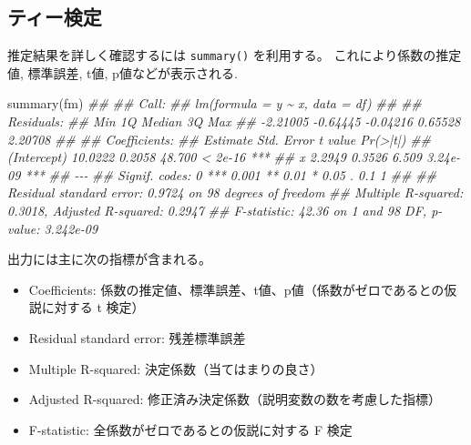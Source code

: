 \documentclass[
  letterpaper,
  xelatex,
  ja=standard, xelatex]{bxjsbook}
\newenvironment{Shaded}{\begin{snugshade}}{\end{snugshade}}
\newcommand{\DocumentationTok}[1]{\textcolor[rgb]{0.37,0.37,0.37}{\textit{#1}}}
\newcommand{\FunctionTok}[1]{\textcolor[rgb]{0.28,0.35,0.67}{#1}}
\newcommand{\NormalTok}[1]{\textcolor[rgb]{0.00,0.23,0.31}{#1}}
\providecommand{\tightlist}{%
  \setlength{\itemsep}{0pt}\setlength{\parskip}{0pt}}\usepackage{longtable,booktabs,array}
\begin{document}
\subsection{ティー検定}\label{ux30c6ux30a3ux30fcux691cux5b9a}

推定結果を詳しく確認するには \texttt{summary()} を利用する。
これにより係数の推定値, 標準誤差, t値, p値などが表示される.

\begin{Shaded}
\begin{Highlighting}[]
\FunctionTok{summary}\NormalTok{(fm)}
\DocumentationTok{\#\# }
\DocumentationTok{\#\# Call:}
\DocumentationTok{\#\# lm(formula = y \textasciitilde{} x, data = df)}
\DocumentationTok{\#\# }
\DocumentationTok{\#\# Residuals:}
\DocumentationTok{\#\#      Min       1Q   Median       3Q      Max }
\DocumentationTok{\#\# {-}2.21005 {-}0.64445 {-}0.04216  0.65528  2.20708 }
\DocumentationTok{\#\# }
\DocumentationTok{\#\# Coefficients:}
\DocumentationTok{\#\#             Estimate Std. Error t value Pr(\textgreater{}|t|)    }
\DocumentationTok{\#\# (Intercept)  10.0222     0.2058  48.700  \textless{} 2e{-}16 ***}
\DocumentationTok{\#\# x             2.2949     0.3526   6.509 3.24e{-}09 ***}
\DocumentationTok{\#\# {-}{-}{-}}
\DocumentationTok{\#\# Signif. codes:  0 \textquotesingle{}***\textquotesingle{} 0.001 \textquotesingle{}**\textquotesingle{} 0.01 \textquotesingle{}*\textquotesingle{} 0.05 \textquotesingle{}.\textquotesingle{} 0.1 \textquotesingle{} \textquotesingle{} 1}
\DocumentationTok{\#\# }
\DocumentationTok{\#\# Residual standard error: 0.9724 on 98 degrees of freedom}
\DocumentationTok{\#\# Multiple R{-}squared:  0.3018, Adjusted R{-}squared:  0.2947 }
\DocumentationTok{\#\# F{-}statistic: 42.36 on 1 and 98 DF,  p{-}value: 3.242e{-}09}
\end{Highlighting}
\end{Shaded}

出力には主に次の指標が含まれる。

\begin{itemize}
\tightlist
\item
  Coefficients:
  係数の推定値、標準誤差、t値、p値（係数がゼロであるとの仮説に対する t
  検定）
\item
  Residual standard error: 残差標準誤差
\item
  Multiple R-squared: 決定係数（当てはまりの良さ）
\item
  Adjusted R-squared: 修正済み決定係数（説明変数の数を考慮した指標）
\item
  F-statistic: 全係数がゼロであるとの仮説に対する F 検定
\end{itemize}
\end{document}
